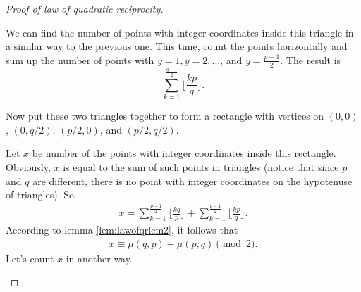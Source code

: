 \documentclass{subfile}
\begin{document}
\begin{proof}[Proof of law of quadratic reciprocity]
\begin{center}
	\end{center}
	We can find the number of points with integer coordinates inside this triangle in a similar way to the previous one. This time, count the points horizontally and sum up the number of points with $y=1, y=2, \ldots$, and $y=\frac{p-1}{2}$. The result is \[ \sum_{k=1}^{\frac{q-1}{2}} \Big\lfloor\frac{kp}{q} \Big\rfloor.\]
	
	Now put these two triangles together to form a rectangle with vertices on $(0,0)$, $\left(0,q/2\right)$, $\left(p/2,0\right)$, and $\left(p/2,q/2\right)$.
	
	Let $x$ be number of the points with integer coordinates inside this rectangle. Obviously, $x$ is equal to the sum of such points in triangles (notice that since $p$ and $q$ are different, there is no point with integer coordinates on the hypotenuse of triangles). So
	\begin{align*}
	x = \sum_{k=1}^{\frac{p-1}{2}} \Big\lfloor\frac{kq}{p} \Big\rfloor+ \sum_{k=1}^{\frac{q-1}{2}} \Big\lfloor\frac{kp}{q} \Big\rfloor.
	\end{align*}
	According to lemma \eqref{lem:lawofqrlem2}, it follows that
	\begin{align}\label{eq:qrlawproof1}
	x \equiv \mu(q,p)+\mu(p,q) \pmod 2.
	\end{align}
	Let's count $x$ in another way.
	\begin{center}
\end{center}
\end{proof}
\end{document}
